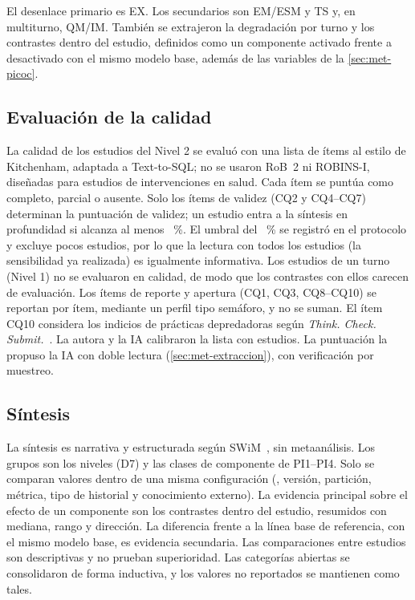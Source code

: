 El desenlace primario es EX. Los secundarios son EM/ESM y TS y, en multiturno, QM/IM. También se extrajeron la degradación por turno y los contrastes dentro del estudio, definidos como un componente activado frente a desactivado con el mismo modelo base, además de las variables de la \cref{sec:met-picoc}.

\subsection{Evaluación de la calidad}
\label{sec:met-calidad}

La calidad de los estudios del Nivel 2 se evaluó con una lista de \nItemsCalidad{} ítems al estilo de Kitchenham, adaptada a Text-to-SQL; no se usaron RoB~2 ni ROBINS-I, diseñadas para estudios de intervenciones en salud. Cada ítem se puntúa como completo, parcial o ausente. Solo los \nItemsValidez{} ítems de validez (CQ2 y CQ4–CQ7) determinan la puntuación de validez; un estudio entra a la síntesis en profundidad si alcanza al menos \umbralValidez{}~\%. El umbral del \umbralValidez{}~\% se registró en el protocolo y excluye pocos estudios, por lo que la lectura con todos los estudios (la sensibilidad ya realizada) es igualmente informativa. Los estudios de un turno (Nivel 1) no se evaluaron en calidad, de modo que los contrastes con ellos carecen de evaluación. Los ítems de reporte y apertura (CQ1, CQ3, CQ8–CQ10) se reportan por ítem, mediante un perfil tipo semáforo, y no se suman. El ítem CQ10 considera los indicios de prácticas depredadoras según \emph{Think. Check. Submit.}~\cite{TCS2026}. La autora y la IA calibraron la lista con \nCalibCalidad{} estudios. La puntuación la propuso la IA con doble lectura (\cref{sec:met-extraccion}), con verificación por muestreo.

\subsection{Síntesis}
\label{sec:met-sintesis}

La síntesis es narrativa y estructurada según SWiM~\cite{Campbell2020SWiM}, sin metaanálisis. Los grupos son los niveles (D7) y las clases de componente de PI1–PI4. Solo se comparan valores dentro de una misma configuración (, versión, partición, métrica, tipo de historial y conocimiento externo). La evidencia principal sobre el efecto de un componente son los contrastes dentro del estudio, resumidos con mediana, rango y dirección. La diferencia frente a la línea base de referencia, con el mismo modelo base, es evidencia secundaria. Las comparaciones entre estudios son descriptivas y no prueban superioridad. Las categorías abiertas se consolidaron de forma inductiva, y los valores no reportados se mantienen como tales.

